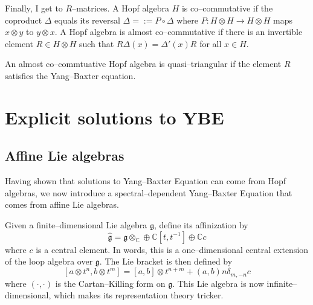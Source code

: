 \documentclass{ximera}
\begin{document}

Finally, I get to $R$--matrices. A Hopf algebra $H$ is co--commutative if the coproduct $\Delta$ equals its reversal
$\Delta=:=P \circ \Delta$ where $P: H \otimes H \rightarrow H \otimes H$ maps $x\otimes y$ to $y \otimes x.$ 
A Hopf algebra is almost co--commutative if there is an invertible element $R \in H \otimes H$ such that 
$R \Delta(x) = \Delta'(x) R$ for all $x \in H.$

An almost co--commtuative Hopf algebra is quasi--triangular if the element $R$ satisfies the Yang--Baxter equation.


\section{Explicit solutions to YBE}

\subsection{Affine Lie algebras}
Having shown that solutions to Yang--Baxter Equation can come from Hopf algebras, we now introduce a 
spectral--dependent Yang--Baxter Equation that comes from affine Lie algebras. 

Given a finite--dimensional Lie algebra $\mathfrak{g}$, define its affinization by
$$
\hat{\mathfrak{g}} = \mathfrak{g} \otimes_{\mathbb{C}} \oplus \mathbb{C}[t,t^{-1}] \oplus \mathbb{C}c
$$
where $c$ is a central element. In words, this is a one--dimensional central extension of the loop algebra
over $\mathfrak{g}.$ The Lie bracket is then defined by 
$$
[a\otimes t^n, b\otimes t^m] = [a,b] \otimes t^{n+m} + (a,b)n\delta_{m,-n}c
$$
where $(\cdot,\cdot)$ is the Cartan--Killing form on $\mathfrak{g}.$ This Lie algebra is now
infinite--dimensional, which makes its representation theory tricker. 
\end{document}
